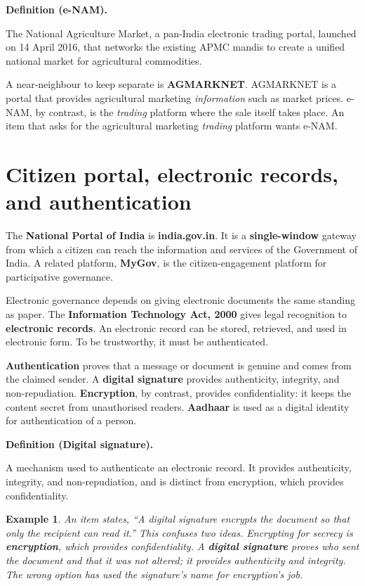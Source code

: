 \documentclass[11pt]{article}
\newtheorem{example}{Example}[section]
\newenvironment{definitionbox}[1]{%
  \par\noindent\textbf{Definition (#1).}\ \itshape
}{\par\vspace{0.3em}}
\begin{document}
\begin{definitionbox}{e-NAM}
The National Agriculture Market, a pan-India electronic trading portal,
launched on 14 April 2016, that networks the existing APMC mandis to create
a unified national market for agricultural commodities.
\end{definitionbox}

A near-neighbour to keep separate is \textbf{AGMARKNET}. AGMARKNET is a
portal that provides agricultural marketing \emph{information} such as
market prices. e-NAM, by contrast, is the \emph{trading} platform where the
sale itself takes place. An item that asks for the agricultural marketing
\emph{trading} platform wants e-NAM.

\section{Citizen portal, electronic records, and authentication}
The \textbf{National Portal of India} is \textbf{india.gov.in}. It is a
\textbf{single-window} gateway from which a citizen can reach the
information and services of the Government of India. A related platform,
\textbf{MyGov}, is the citizen-engagement platform for participative
governance.

Electronic governance depends on giving electronic documents the same
standing as paper. The \textbf{Information Technology Act, 2000} gives legal
recognition to \textbf{electronic records}. An electronic record can be
stored, retrieved, and used in electronic form. To be trustworthy, it must
be authenticated.

\textbf{Authentication} proves that a message or document is genuine and
comes from the claimed sender. A \textbf{digital signature} provides
authenticity, integrity, and non-repudiation. \textbf{Encryption}, by
contrast, provides confidentiality: it keeps the content secret from
unauthorised readers. \textbf{Aadhaar} is used as a digital identity for
authentication of a person.

\begin{definitionbox}{Digital signature}
A mechanism used to authenticate an electronic record. It provides
authenticity, integrity, and non-repudiation, and is distinct from
encryption, which provides confidentiality.
\end{definitionbox}

\begin{example}
An item states, ``A digital signature encrypts the document so that only the
recipient can read it.'' This confuses two ideas. Encrypting for secrecy is
\textbf{encryption}, which provides confidentiality. A \textbf{digital
signature} proves who sent the document and that it was not altered; it
provides authenticity and integrity. The wrong option has used the
signature's name for encryption's job.
\end{example}
\end{document}
